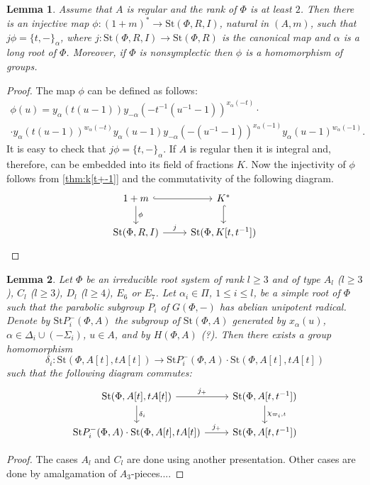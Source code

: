 \documentclass[oneside,12pt]{amsart}
\numberwithin{equation}{section}
\newtheorem{lem}{Lemma}
\numberwithin{lem}{section}
\theoremstyle{definition}
\theoremstyle{remark}
\newcommand{\Stb}{\mathrm{St}}
\begin{document}
\begin{lem}\label{lem:tul3.1zh}
Assume that $A$ is regular and the rank of $\Phi$ is at least $2$.
Then there is an injective map $\phi\colon (1+m)^*\to\Stb(\Phi, R, I)$, natural in $(A,m)$,
such that $j \phi = \{t, -\}_\alpha$, where $j\colon\Stb(\Phi,R,I)\to \Stb(\Phi,R)$ is the canonical map and $\alpha$ is a long root of $\Phi$.
Moreover, if $\Phi$ is nonsymplectic then $\phi$ is a homomorphism of groups.
\end{lem}
\begin{proof}
The map $\phi$ can be defined as follows:
\begin{multline*}
\phi(u)=y_\alpha(t(u-1))y_{-\alpha}(-t^{-1}(u^{-1}-1))^{x_\alpha(-t)}\cdot \\
\cdot y_\alpha(t(u-1))^{w_\alpha(-t)}
y_\alpha(u-1)y_{-\alpha}(-(u^{-1}-1))^{x_\alpha(-1)}y_\alpha(u-1)^{w_\alpha(-1)}.
\end{multline*}
It is easy to check that $j \phi = \{t, -\}_\alpha$.
If $A$ is regular then it is integral and, therefore, can be embedded into its field of fractions $K$.
Now the injectivity of $\phi$ follows from \cref{thm:k[t+-1]} and the commutativity of the following diagram.
\[\begin{tikzcd}
 1+m \ar[hookrightarrow, r] \ar[d, "\phi"] & K^* \ar[hookrightarrow, d] \\
  \Stb(\Phi ,R, I) \ar[r, "j"]             & \Stb(\Phi, K[t, t^{-1}])
\end{tikzcd} \qedhere\]
\end{proof}

\begin{lem}\label{lem:sigma-X}
Let $\Phi$ be an irreducible root system of rank $l\ge 3$ and of type $A_l$ ($l\ge 3$), $C_l$ ($l\ge 3$), $D_l$ ($l\ge 4$),
$E_6$ or $E_7$. Let $\alpha_i\in\Pi$, $1\le i\le l$, be a simple root of $\Phi$ such that the
parabolic subgroup $P_i$ of $G(\Phi,-)$ has abelian unipotent radical. Denote by $\Stb P_i^-(\Phi,A)$
the subgroup of $\Stb(\Phi,A)$ generated by $x_\alpha(u)$, $\alpha\in\Delta_i\cup(-\Sigma_i)$, $u\in A$,
and by $H(\Phi,A)$ (?).
Then there exists a group homomorphism
$$
\delta_i:\Stb(\Phi,A[t],tA[t])\to \Stb P_i^-(\Phi,A)\cdot \Stb(\Phi,A[t],tA[t])
$$
such that the following diagram commutes:
 \[\begin{tikzcd}
\Stb(\Phi,A[t],tA[t]) \arrow[r, "j_+"] \arrow[d, "\delta_i"] & \Stb(\Phi,A[t, t^{-1}])  \ar[d, "\chi_{\varpi_i,t}"] \\
\Stb P_i^-(\Phi,A)\cdot \Stb(\Phi,A[t],tA[t]) \arrow[r, "j_+"] &  \Stb(\Phi,A[t, t^{-1}])
\end{tikzcd}\]
\end{lem}
\begin{proof}
The cases $A_l$ and $C_l$ are done using another presentation. Other cases are done by amalgamation
of $A_3$-pieces....
\end{proof}
\end{document}
